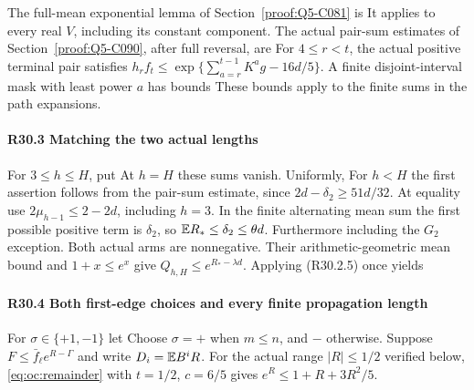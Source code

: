 The full-mean exponential lemma of Section~\ref{proof:Q5-C081} is
It applies to every real $V$, including its constant component.
The actual pair-sum estimates of Section~\ref{proof:Q5-C090}, after
full reversal, are
For $4\le r<t$, the actual positive terminal pair satisfies
$h_rf_t\le\exp\{\sum_{a=r}^{t-1}K^ag-16d/5\}$.
A finite disjoint-interval mask with least power $a$ has bounds
These bounds apply to the finite sums in the path expansions.

\paragraph{R30.3 Matching the two actual lengths}
For $3\le h\le H$, put
At $h=H$ these sums vanish. Uniformly,
For $h<H$ the first assertion follows from the pair-sum estimate,
since $2d-\delta_2\ge51d/32$. At equality use
$2\mu_{h-1}\le2-2d$, including $h=3$. In the finite alternating
mean sum the first possible positive term is $\delta_2$, so
$\mathbb E R_*\le\delta_2\le\theta d$. Furthermore
including the $G_2$ exception. Both actual arms are nonnegative.
Their arithmetic-geometric mean bound and $1+x\le e^x$ give
$Q_{h,H}\le e^{R_*-\lambda d}$. Applying (R30.2.5) once yields

\paragraph{R30.4 Both first-edge choices and every finite propagation length}
For $\sigma\in\{+1,-1\}$ let
Choose $\sigma=+$ when $m\le n$, and $-$ otherwise.
Suppose $F\le\bar f_\ell e^{R-\Gamma}$ and write
$D_i=\mathbb E B^iR$. For the actual range $|R|\le1/2$ verified below,
\eqref{eq:oc:remainder} with $t=1/2$, $c=6/5$ gives
$e^R\le1+R+3R^2/5$.

